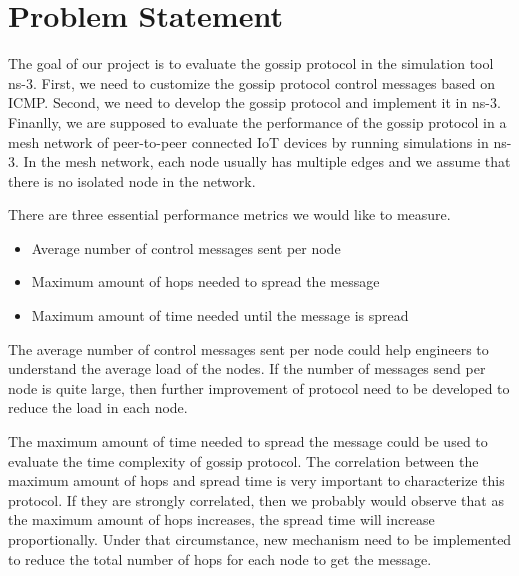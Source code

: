 \documentclass[12pt,journal]{IEEEtran}
\begin{document}

\section{Problem Statement}\label{sec:problem}

The goal of our project is to evaluate the gossip protocol in the simulation tool ns-3. First, we need to customize the gossip protocol control messages based on ICMP. Second, we need to develop the gossip protocol and implement it in ns-3. Finanlly, we are supposed to evaluate the performance of the gossip protocol in a mesh network of peer-to-peer connected IoT devices by running simulations in ns-3. In the mesh network, each node usually has multiple edges and we assume that there is no isolated node in the network.

There are three essential performance metrics we would like to measure. 

\begin{itemize}
 \item Average number of control messages sent per node
 \item Maximum amount of hops needed to spread the message
 \item Maximum amount of time needed until the message is spread
\end{itemize}

The average number of control messages sent per node could help engineers to understand the average load of the nodes. If the number of messages send per node is quite large, then further improvement of protocol need to be developed to reduce the load in each node.

The maximum amount of time needed to spread the message could be used to evaluate the time complexity of gossip protocol. The correlation between the maximum amount of hops and spread time is very important to characterize this protocol. If they are strongly correlated, then we probably would observe that as the maximum amount of hops increases, the spread time will increase proportionally. Under that circumstance, new mechanism need to be implemented to reduce the total number of hops for each node to get the message. 
\end{document}
